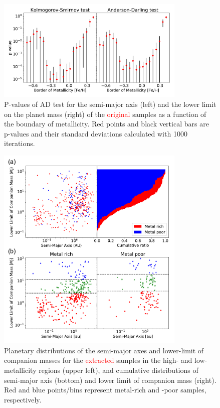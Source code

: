 \documentclass[twocolumn, dvipdfmx]{aastex62}
\def\red<#1>{\textcolor{red}{#1}}
\begin{document}
\begin{CJK*}{UTF8}{min}
\begin{figure}[t]
\begin{center}
\includegraphics[width=9cm]{../../../Figure/pvalues_plot.pdf}
\caption{P-values of AD test for the semi-major axis (left) and the lower limit on the planet mass (right) of the \red<original> samples as a function of the boundary of metallicity. Red points and black vertical bars are p-values and their standard deviations calculated with 1000 iterations. \label{fig:pvalue}}
\end{center}
\end{figure}

\begin{figure}[t]
\begin{center}
\includegraphics[width=9cm]{../../../Figure/a_Mp.pdf}
\caption{Planetary distributions of the semi-major axes and lower-limit of companion masses for the \red<extracted> samples in the high- and low-metallicity regions (upper left), and cumulative distributions of semi-major axis (bottom) and lower limit of companion mass (right). Red and blue points/bins represent metal-rich and -poor samples, respectively. \label{fig:a_Mp}}
\end{center}
\end{figure}



\end{CJK*}
\end{document}
